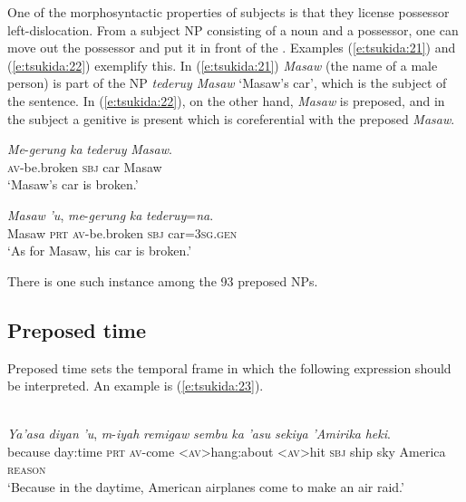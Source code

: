 \documentclass[output=paper
,modfonts
,nonflat]{langsci/langscibook}
\begin{document}
One of the morphosyntactic properties of subjects is that they license possessor left-dislocation. From a subject NP consisting of a noun and a possessor, one can move out the possessor and put it in front of the . Examples (\ref{e:tsukida:21}) and (\ref{e:tsukida:22}) exemplify this. In (\ref{e:tsukida:21}) \textit{Masaw} (the name of a male person) is part of the NP \textit{tederuy Masaw} ‘Masaw’s car’, which is the subject of the sentence. In (\ref{e:tsukida:22}), on the other hand, \textit{Masaw} is preposed, and in the subject a genitive  is present which is coreferential with the preposed \textit{Masaw}.

\begin{exe}
	\ex\label{e:tsukida:21} 
	\gll \textit{Me}-\textit{gerung}  \textit{ka}   \textit{tederuy}   \textit{Masaw}.\\
	\textsc{av}-be.broken   \textsc{sbj} car Masaw\\
	\glt ‘Masaw’s car is broken.’
\end{exe}

\begin{exe}
	\ex\label{e:tsukida:22} 
	\gll \textit{Masaw}  \textit{'u}, \textit{me}-\textit{gerung} \textit{ka} \textit{tederuy}=\textit{na}.\\
	Masaw  \textsc{prt} \textsc{av}-be.broken  \textsc{sbj} car=\textsc{3sg.gen}\\
	\glt ‘As for Masaw, his car is broken.’
\end{exe}

\noindent
There is one such instance among the 93 preposed NPs.

\subsection{\label{s:tsukida:2.4}Preposed time}

Preposed time sets the temporal frame in which the following expression should be interpreted. An example is (\ref{e:tsukida:23}).

\begin{exe}
	\label{e:tsukida:23}\\
	\gll \textit{Ya'asa} \textit{diyan} \textit{'u}, \textit{m}-\textit{iyah} \textit{r}{\USSmaller}\textit{em}{\USGreater}\textit{igaw} \textit{s}{\USSmaller}\textit{em}{\USGreater}\textit{bu} \textit{ka} \textit{'asu} \textit{sekiya} \textit{'Amirika} \textit{heki}.\\
	because day:time \textsc{prt} \textsc{av}-come  <\textsc{av}>hang:about	<\textsc{av}>hit  \textsc{sbj}  ship sky America  \textsc{reason}\\
	\glt ‘Because in the daytime, American airplanes come to make an air raid.’
\end{exe}
\end{document}
